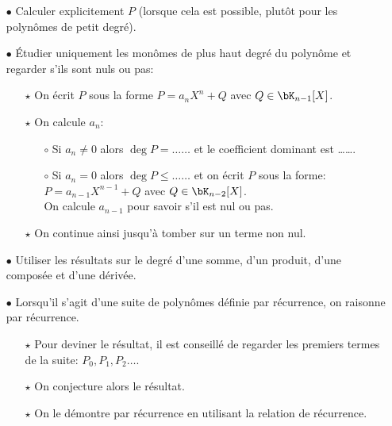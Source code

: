 \documentclass[a4paper, 11pt,reqno]{article}
\begin{document}
\hspace{-1cm}
\begin{dboxminipage}{1\textwidth}
	\begin{itemize}
		\item[$\bullet$] Calculer explicitement $P$ (lorsque cela est possible, plut\^{o}t pour les polyn\^{o}mes de petit degr\'e).
		\item[$\bullet$] \'Etudier uniquement les mon\^omes de plus haut degr\'e du polyn\^ome et regarder s'ils sont nuls ou pas:
		      \begin{itemize}
			      \item[$\star$] On \'ecrit $P$ sous la forme $P=a_nX^n+Q$ avec $Q\in\bK_{n-1}\lbrack X\rbrack$.
			      \item[$\star$]  On calcule $a_n$:
			            \begin{itemize}
				            \item[$\circ$] Si $a_n\not= 0$ alors $\deg{P}=\ldots \ldots$ et le coefficient dominant est \ldots \ldots.
				            \item[$\circ$] Si $a_n= 0$ alors $\deg{P}\leq \ldots \ldots$ et on \'ecrit $P$ sous la forme: $P=a_{n-1}X^{n-1}+Q$ avec $Q\in\bK_{n-2}\lbrack X\rbrack$.\\
				                  \hspace{1.3cm} On calcule $a_{n-1}$ pour savoir s'il est nul ou pas.
			            \end{itemize}
			      \item[$\star$] On continue ainsi jusqu'\`{a} tomber sur un terme non nul.
		      \end{itemize}
		\item[$\bullet$] Utiliser les r\'esultats sur le degr\'e d'une somme, d'un produit, d'une compos\'ee et d'une d\'eriv\'ee.
		\item[$\bullet$] Lorsqu'il s'agit d'une suite de polyn\^omes d\'efinie par r\'ecurrence, on raisonne par r\'ecurrence.
		      \begin{itemize}
			      \item[$\star$] Pour deviner le r\'esultat, il est conseill\'e de regarder les premiers termes de la suite: $P_0,P_1,P_2\dots$.
			      \item[$\star$] On conjecture alors le r\'esultat.
			      \item[$\star$] On le d\'emontre par r\'ecurrence en utilisant la relation de r\'ecurrence.
		      \end{itemize}
	\end{itemize}

\end{dboxminipage}
\end{document}
